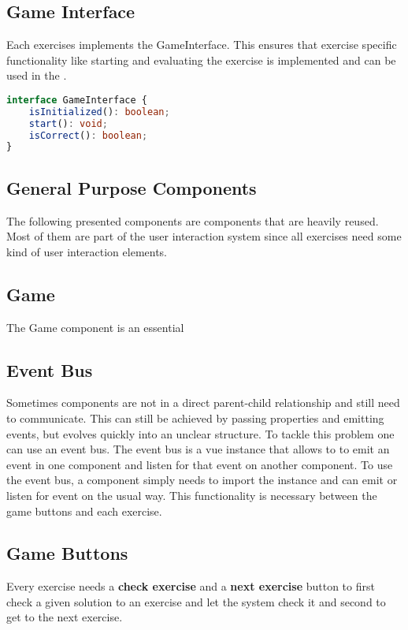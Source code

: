 \subsection*{Game Interface}
Each exercises implements the GameInterface. This ensures that exercise specific functionality like starting and evaluating the exercise is implemented and can be used in the .

\begin{lstlisting}[language=TypeScript,caption={GameInterface},label={lst:gameInterface}]
interface GameInterface {
    isInitialized(): boolean;
    start(): void;
    isCorrect(): boolean;
}
\end{lstlisting}

\subsection{General Purpose Components}
The following presented components are components that are heavily reused. Most of them are part of the user interaction system since all exercises need some kind of user interaction elements.

\subsection*{Game}
The Game component is an essential

\subsection{Event Bus}
Sometimes components are not in a direct parent-child relationship and still need to communicate. This can still be achieved by passing properties and emitting events, but evolves quickly into an unclear structure. To tackle this problem one can use an event bus. 
The event bus is a vue instance that allows to to emit an event in one component and listen for that event on another component. To use the event bus, a component simply needs to import the instance and can emit or listen for event on the usual way. This functionality is necessary between the game buttons and each exercise.

\subsection*{Game Buttons}
Every exercise needs a \textbf{check exercise} and a \textbf{next exercise} button to first check a given solution to an exercise and let the system check it and second to get to the next exercise.

